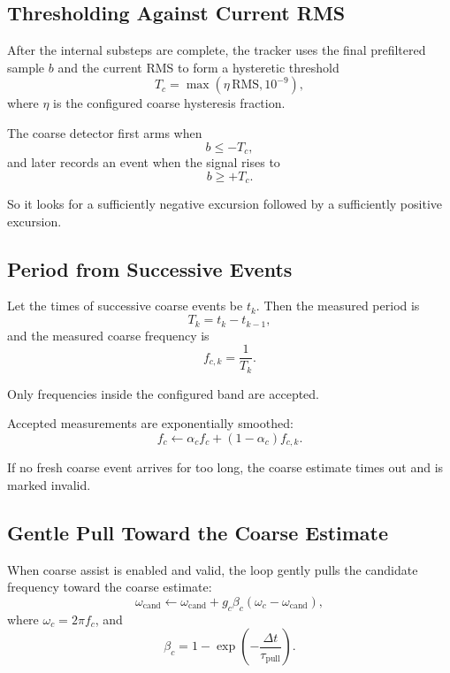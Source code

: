 \documentclass[conference]{IEEEtran}
\begin{document}
\subsection{Thresholding Against Current RMS}

After the internal substeps are complete, the tracker uses the final
prefiltered sample \(b\) and the current RMS to form a hysteretic threshold
\begin{equation}
  T_c = \max(\eta\,\mathrm{RMS}, 10^{-9}),
\end{equation}
where \(\eta\) is the configured coarse hysteresis fraction.

The coarse detector first arms when
\begin{equation}
  b \le -T_c,
\end{equation}
and later records an event when the signal rises to
\begin{equation}
  b \ge +T_c.
\end{equation}

So it looks for a sufficiently negative excursion followed by a sufficiently
positive excursion.

\subsection{Period from Successive Events}

Let the times of successive coarse events be \(t_k\). Then the measured period
is
\begin{equation}
  T_k = t_k - t_{k-1},
\end{equation}
and the measured coarse frequency is
\begin{equation}
  f_{c,k} = \frac{1}{T_k}.
\end{equation}

Only frequencies inside the configured band are accepted.

Accepted measurements are exponentially smoothed:
\begin{equation}
  f_c \leftarrow \alpha_c f_c + (1-\alpha_c) f_{c,k}.
\end{equation}

If no fresh coarse event arrives for too long, the coarse estimate times out
and is marked invalid.

\subsection{Gentle Pull Toward the Coarse Estimate}

When coarse assist is enabled and valid, the loop gently pulls the candidate
frequency toward the coarse estimate:
\begin{equation}
  \omega_{\mathrm{cand}}
  \leftarrow
  \omega_{\mathrm{cand}}
  +
  g_c \beta_c(\omega_c - \omega_{\mathrm{cand}}),
\end{equation}
where \(\omega_c = 2\pi f_c\), and
\begin{equation}
  \beta_c = 1 - \exp\!\left(-\frac{\Delta t}{\tau_{\mathrm{pull}}}\right).
\end{equation}
\end{document}
